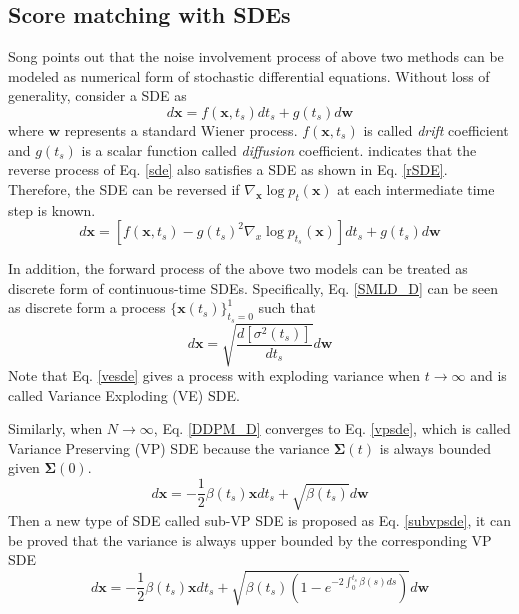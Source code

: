 \subsection{Score matching with SDEs}
Song \cite{song2020score} points out that the noise involvement process of above two methods can be modeled as numerical form of stochastic differential equations. Without loss of generality, consider a SDE as 
\begin{equation}\label{sde}
	d\textbf{x}=f(\textbf{x},t_s)dt_s + g(t_s)d\textbf{w}
\end{equation}
where $\textbf{w}$ represents a standard Wiener process. $f(\textbf{x},t_s)$ is called \textit{drift} coefficient and $g(t_s)$ is a scalar function called \textit{diffusion} coefficient. \cite{anderson1982reverse} indicates that the reverse process of Eq. \ref{sde} also satisfies a SDE  as shown in Eq. \ref{rSDE}. Therefore, the SDE can be reversed if $\nabla_{\textbf{x}}\log p_t(\textbf{x})$ at each intermediate time step is known.
\begin{equation}\label{rSDE}
	d\textbf{x} = [f(\textbf{x},t_s)-g(t_s)^2\nabla_x \log p_{t_s}(\textbf{x})]dt_s + g(t_s)d\textbf{w}
\end{equation}

In addition, the forward process of the above two models can be treated as discrete form of continuous-time SDEs.  Specifically, Eq. \ref{SMLD_D} can be seen as discrete form a process $\{\textbf{x}(t_s)\}^1_{t_s=0}$ such that 
\begin{equation}\label{vesde}
d\textbf{x} = \sqrt{\frac{d[\sigma^2(t_s)]}{dt_s}}d\textbf{w}
\end{equation}
Note that Eq. \ref{vesde} gives a process with exploding variance when $t\rightarrow \infty$ and is called Variance Exploding (VE) SDE.

Similarly, when $N\rightarrow \infty$, Eq. \ref{DDPM_D} converges to Eq. \ref{vpsde}, which is called Variance Preserving (VP) SDE  because the variance $\boldsymbol{\Sigma}(t)$ is always bounded given $\boldsymbol{\Sigma}(0)$.
\begin{equation}\label{vpsde}
	d\textbf{x} = -\frac{1}{2}\beta(t_s)\textbf{x}dt_s + \sqrt{\beta(t_s)}d\textbf{w}
\end{equation}
Then a new type of SDE called sub-VP SDE is proposed as Eq. \ref{subvpsde}, it can be proved that the variance is always upper bounded by the corresponding VP SDE
\begin{equation}\label{subvpsde}
	d\textbf{x} = -\frac{1}{2}\beta(t_s)\textbf{x}dt_s + \sqrt{\beta(t_s)(1-e^{-2\int^{t_s}_0\beta(s)ds})}d\textbf{w}
\end{equation}

